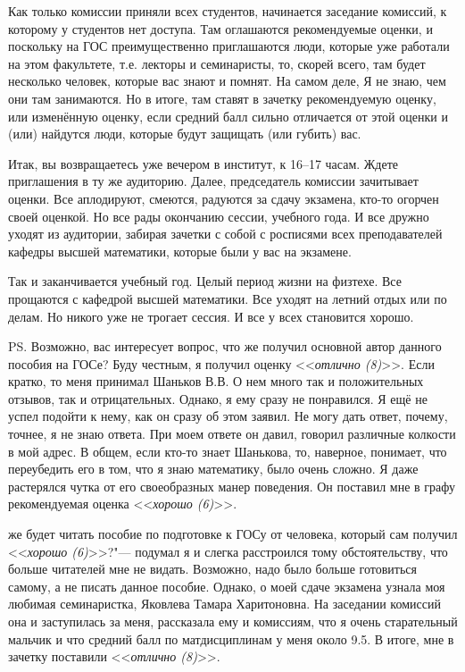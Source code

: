 Как только комиссии приняли всех студентов, начинается заседание комиссий, к которому у студентов нет доступа. Там оглашаются рекомендуемые оценки, и поскольку на ГОС преимущественно приглашаются люди, которые уже работали на этом факультете, т.е. лекторы и семинаристы, то, скорей всего, там будет несколько человек, которые вас знают и помнят. На самом деле, Я не знаю, чем они там занимаются. Но в итоге, там ставят в зачетку рекомендуемую оценку, или изменённую оценку, если средний балл сильно отличается от этой оценки и (или) найдутся люди, которые будут защищать (или губить) вас.

Итак, вы возвращаетесь уже вечером в институт, к 16--17 часам. Ждете приглашения в ту же аудиторию. Далее, председатель комиссии зачитывает оценки. Все аплодируют, смеются, радуются за сдачу экзамена, кто-то огорчен своей оценкой. Но все рады окончанию сессии, учебного года. И все дружно уходят из аудитории, забирая зачетки с собой с росписями всех преподавателей кафедры высшей математики, которые были у вас на экзамене.

Так и заканчивается учебный год. Целый период жизни на физтехе. Все прощаются с кафедрой высшей математики. Все уходят на летний отдых или по делам. Но никого уже не трогает сессия. И все у всех становится хорошо. 

\mbox{}

PS. Возможно, вас интересует вопрос, что же получил основной автор данного пособия на ГОСе? Буду честным, я получил оценку <<\textit{отлично (8)}>>. Если кратко, то меня принимал Шаньков В.В. О нем много так и положительных отзывов, так и отрицательных. Однако, я ему сразу не понравился. Я ещё не успел подойти к нему, как он сразу об этом заявил. Не могу дать ответ, почему, точнее, я не знаю ответа. При моем ответе он давил, говорил различные колкости в мой адрес.  В общем, если кто-то знает Шанькова, то, наверное, понимает, что переубедить его в том, что я знаю математику, было очень сложно. Я даже растерялся чутка от его своеобразных манер поведения. Он поставил мне в графу рекомендуемая оценка <<\textit{хорошо (6)}>>. 

 же будет читать пособие по подготовке к ГОСу от человека, который сам получил <<\textit{хорошо (6)}>>?\grqq "--- подумал я и слегка расстроился тому обстоятельству, что больше читателей мне не видать. Возможно, надо было больше готовиться самому, а не писать данное пособие. Однако, о моей сдаче экзамена узнала моя любимая семинаристка, Яковлева Тамара Харитоновна. На заседании комиссий она и заступилась за меня, рассказала ему и комиссиям, что я очень старательный мальчик и что средний балл по матдисциплинам у меня около 9.5. В итоге, мне в зачетку поставили <<\textit{отлично (8)}>>. 

